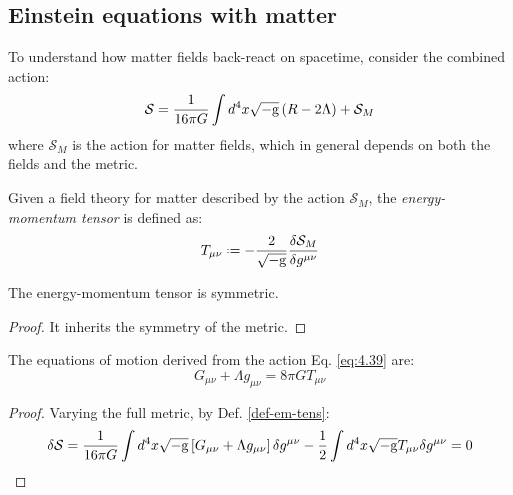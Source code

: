 \subsection{Einstein equations with matter}

To understand how matter fields back-react on spacetime, consider the combined action:
\begin{equation}
  \mathcal{S} = \frac{1}{16\pi G} \int d^4 x \sqrt{-\mathrm{g}} \left( R - 2 \Lambda \right) + \mathcal{S}_M
  \label{eq:4.39}
\end{equation}
where $ \mathcal{S}_M $ is the action for matter fields, which in general depends on both the fields and the metric.

\begin{definition}\label{def-em-tens}
  Given a field theory for matter described by the action $ \mathcal{S}_M $, the \textit{energy-momentum tensor} is defined as:
  \begin{equation}
    T_{\mu \nu} \defeq - \frac{2}{\sqgm} \frac{\delta \mathcal{S}_M}{\delta g^{\mu \nu}}
    \label{eq:4.40}
  \end{equation}
\end{definition}

\begin{proposition}
  The energy-momentum tensor is symmetric.
\end{proposition}
\begin{proof}
  It inherits the symmetry of the metric.
\end{proof}

\begin{proposition}
  The equations of motion derived from the action Eq. \ref{eq:4.39} are:
  \begin{equation}
    G_{\mu \nu} + \Lambda g_{\mu \nu} = 8\pi G T_{\mu \nu}
    \label{eq:4.41}
  \end{equation}
\end{proposition}
\begin{proof}
  Varying the full metric, by Def. \ref{def-em-tens}:
  \begin{equation*}
    \delta \mathcal{S} = \frac{1}{16\pi G} \int d^4 x \sqrt{-\mathrm{g}} \left[ G_{\mu \nu} + \Lambda g_{\mu \nu} \right] \delta g^{\mu \nu} - \frac{1}{2} \int d^4 x \sqrt{-\mathrm{g}} T_{\mu \nu} \delta g^{\mu \nu} = 0
  \end{equation*}
\end{proof}


